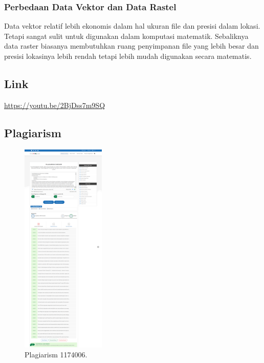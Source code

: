\subsubsection{Perbedaan Data Vektor dan Data Rastel}
Data vektor relatif lebih ekonomis dalam hal ukuran file dan presisi dalam lokasi. Tetapi sangat sulit untuk digunakan dalam komputasi matematik. Sebaliknya data raster biasanya membutuhkan ruang penyimpanan file yang lebih besar dan presisi lokasinya lebih rendah tetapi lebih mudah digunakan secara matematis.

\subsection{Link}
\href{https://youtu.be/2BjDss7m9SQ}{https://youtu.be/2BjDss7m9SQ}

\subsection{Plagiarism}
\begin{figure}[H]
	\includegraphics[width=4cm]{figures/1174006/1174006plagiarism1.png}
	\centering
	\caption{Plagiarism 1174006.}
\end{figure}
